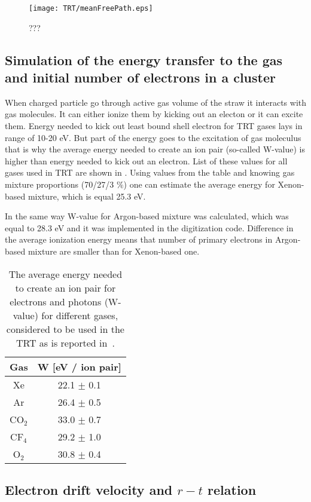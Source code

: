 \begin{figure}
\centering
 \texttt{[image: TRT/meanFreePath.eps]}
\caption{???}
\label{fig:meanFreePath}
\end{figure}


\subsection{Simulation of the energy transfer to the gas and initial number of electrons in a cluster}

When charged particle go through active gas volume of the straw it interacts with gas molecules.
It can either ionize them by kicking out an electon or it can excite them. Energy needed to kick out least bound shell electron for TRT gases lays
in range of 10-20 eV. But part of the energy goes to the excitation of gas moleculus that is why the average energy needed to create an ion pair (so-called W-value) is higher than energy needed to 
kick out an electron. List of these values for all gases used in TRT are shown in .
Using values from the table and knowing gas mixture proportions (70/27/3 $\%$) one can estimate the average energy for Xenon-based mixture, which is equal 25.3 eV.

In the same way W-value for Argon-based mixture was calculated, which was equal to 28.3 eV and it was implemented in the digitization code.
Difference in the average ionization energy means that number of primary electrons in Argon-based mixture are smaller than for Xenon-based one.

\begin{table}[p]
  \begin{tabular}{c|c}
    Gas & W [eV / ion pair]\\
    \hline
    Xe & 22.1 $\pm$ 0.1 \\
    Ar & 26.4 $\pm$ 0.5 \\
    CO$_2$ & 33.0 $\pm$ 0.7 \\
    CF$_4$ & 29.2 $\pm$ 1.0 \\
    O$_2$ & 30.8 $\pm$ 0.4 \\
  \end{tabular}
  \caption{The average energy needed to create an ion pair for electrons and photons (W-value) for different gases, 
  considered to be used in the TRT as is reported in~\cite{cwetanski_thesis}.}
  \label{tab:ionization_energy}
\end{table}

\subsection{Electron drift velocity and $r-t$ relation}


